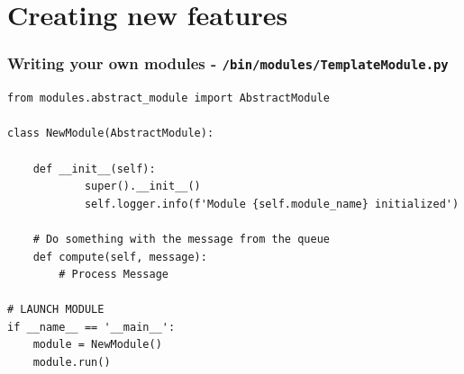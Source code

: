 \documentclass{beamer}
\begin{document}
\section{Creating new features}


\lstset{style=code}
\begin{frame}[fragile]
    \frametitle{Writing your own modules - \texttt{/bin/modules/TemplateModule.py}}
    \begin{lstlisting}
from modules.abstract_module import AbstractModule

class NewModule(AbstractModule):

	def __init__(self):
		    super().__init__()
		    self.logger.info(f'Module {self.module_name} initialized')

	# Do something with the message from the queue
	def compute(self, message):
		# Process Message

# LAUNCH MODULE
if __name__ == '__main__':
    module = NewModule()
    module.run()

    \end{lstlisting}
\end{frame}
\end{document}
